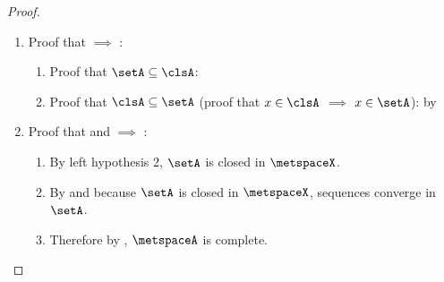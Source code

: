 \begin{proof}
\begin{enumerate}
\item Proof that  $\implies$ :
\begin{enumerate}
  \item Proof that $\setA\subseteq\clsA$: 
  \item Proof that $\clsA\subseteq\setA$ (proof that $x\in\clsA$ $\implies$ $x\in\setA$): by 
\end{enumerate}

\item Proof that  and  $\implies$ :

  \begin{enumerate}
    \item By left hypothesis 2, $\setA$ is closed in $\metspaceX$.
    \item By  and because $\setA$ is closed in $\metspaceX$,
          sequences converge in $\setA$.
    \item Therefore by , $\metspaceA$ is complete.
  \end{enumerate}
\end{enumerate}
\end{proof}

